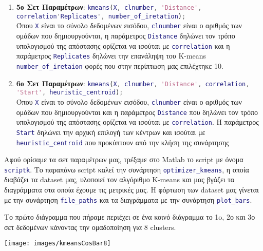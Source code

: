\begin{enumerate}
\item \textbf{5ο Σετ Παραμέτρων}:
\lstinline[language=MATLAB, breaklines=true]!kmeans(X, clnumber, 'Distance', correlation'Replicates', number_of_iretation);!
\\Όπου
\lstinline[language=MATLAB]!X! είναι το σύνολο δεδομένων εισόδου,
\lstinline[language=MATLAB]!clnumber! είναι ο αριθμός των ομάδων που δημιουργούνται, η παράμετρος
\lstinline[language=MATLAB]!Distance! δηλώνει τον τρόπο υπολογισμού της απόστασης ορίζεται να ισούται με
\lstinline[language=MATLAB]!correlation! και η παράμετρος \lstinline[language=MATLAB]!Replicates! δηλώνει την επανάληψη του K-means
\lstinline[language=MATLAB]!number_of_iretaion! φορές που στην περίπτωση μας επιλέχτηκε 10.

\item \textbf{6ο Σετ Παραμέτρων}:
\lstinline[language=MATLAB, breaklines=true]!kmeans(X, clnumber, 'Distance', correlation, 'Start', heuristic_centroid);!
\\Όπου
\lstinline[language=MATLAB]!X! είναι το σύνολο δεδομένων εισόδου,
\lstinline[language=MATLAB]!clnumber! είναι ο αριθμός των ομάδων που δημιουργούνται και η παράμετρος
\lstinline[language=MATLAB]!Distance! που δηλώνει τον τρόπο υπολογισμού της απόστασης ορίζεται να ισούται με
\lstinline[language=MATLAB]!correlation!.
Η παράμετρος \lstinline[language=MATLAB]!Start! δηλώνει την αρχική επιλογή των κέντρων και ισούται με
\lstinline[language=MATLAB]!heuristic_centroid! που προκύπτουν από την κλήση της συνάρτησης
\end{enumerate}

Αφού ορίσαμε τα σετ παραμέτρων μας, τρέξαμε στο Matlab το script με όνομα \lstinline[language=MATLAB]!scriptk!.
Tο παραπάνω script καλεί την συνάρτηση \lstinline[language=MATLAB]!optimizer_kmeans!, η οποία διαβάζει τα dataset μας, υλοποιεί τον αλγόριθμο K-means και μας βγάζει τα διαγράμματα στα οποία έχουμε τις μετρικές μας.
Η φόρτωση των dataset μας γίνεται με την συνάρτηση \lstinline[language=MATLAB]!file_paths! και τα διαγράμματα με την συνάρτηση \lstinline[language=MATLAB]!plot_bars!.

Το πρώτο διάγραμμα που πήραμε περιέχει σε ένα κοινό διάγραμμα το 1o, 2ο και 3ο σετ δεδομένων κάνοντας την ομαδοποίηση για 8 clusters.
\noindent\begin{minipage}{\linewidth}
    \centering
    \texttt{[image: images/kmeansCosBar8]}
    \label{fig:kmeansCosBar8}
\end{minipage}

